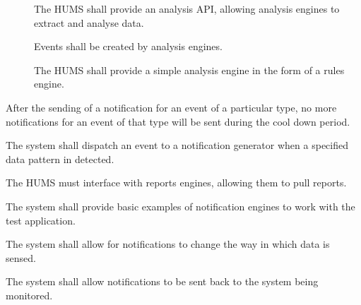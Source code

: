 \begin{description}[leftmargin=1.3cm, itemsep=0.3cm]
\begin{description}
 		\item[] The HUMS shall provide an analysis API, allowing 			analysis engines to extract and analyse data.
		
		\item[] Events shall be created by analysis engines.

 		\item[] The HUMS shall provide a simple analysis engine
 		in the form of a rules engine.
	\end{description}
	
	\item[\fr{8}]After the sending of a notification for an event of a particular 		type, no more notifications for an event of that type will be sent 				during the cool down period.
	\item[\fr{9}]The system shall dispatch an event to a notification generator 		when a specified data pattern in detected.
	\item[\fr{7}] The HUMS must interface with reports engines, allowing 			them to pull reports.
	\item[\fr{11}] The system shall provide basic examples of notification 			engines to work with the test application.
	\item[\fr{12}] The system shall allow for notifications to change the way in 		which data is sensed.
	 \item[\fr{13}] The system shall allow notifications to be sent back to the 		system being monitored.
\end{description}


